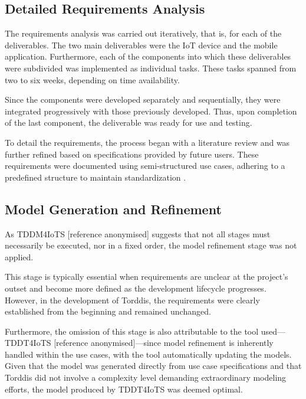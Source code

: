                 \subsection{Detailed Requirements Analysis}
                The requirements analysis was carried out iteratively, that is, for each of the deliverables. The two main deliverables were the IoT device and the mobile application. Furthermore, each of the components into which these deliverables were subdivided was implemented as individual tasks. These tasks spanned from two to six weeks, depending on time availability.
                
                Since the components were developed separately and sequentially, they were integrated progressively with those previously developed. Thus, upon completion of the last component, the deliverable was ready for use and testing.
                
                To detail the requirements, the process began with a literature review and was further refined based on specifications provided by future users. These requirements were documented using semi-structured use cases, adhering to a predefined structure to maintain standardization \citep{Zegzhda2018Use}.
                
                \subsection{Model Generation and Refinement}
                As TDDM4IoTS [reference anonymised] suggests that not all stages must necessarily be executed, nor in a fixed order, the model refinement stage was not applied.
                
                This stage is typically essential when requirements are unclear at the project's outset and become more defined as the development lifecycle progresses. However, in the development of Torddis, the requirements were clearly established from the beginning and remained unchanged.
                
                Furthermore, the omission of this stage is also attributable to the tool used—TDDT4IoTS [reference anonymised]—since model refinement is inherently handled within the use cases, with the tool automatically updating the models. Given that the model was generated directly from use case specifications and that Torddis did not involve a complexity level demanding extraordinary modeling efforts, the model produced by TDDT4IoTS was deemed optimal.
                
